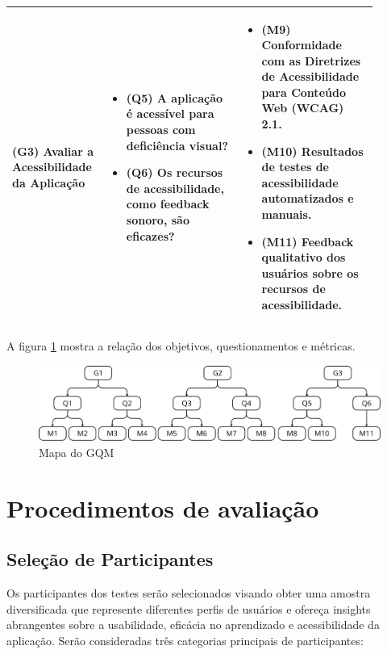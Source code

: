 \begin{table}[h]
\begin{tabular}{|p{0.2\linewidth}|p{0.35\linewidth}|p{0.35\linewidth}|}
        \textbf{(G3) Avaliar a Acessibilidade da Aplicação} & 
        \begin{itemize}
            \item (Q5) A aplicação é acessível para pessoas com deficiência visual?
            \item (Q6) Os recursos de acessibilidade, como feedback sonoro, são eficazes?
        \end{itemize} & 
        \begin{itemize}
            \item (M9) Conformidade com as Diretrizes de Acessibilidade para Conteúdo Web (WCAG) 2.1.
            \item (M10) Resultados de testes de acessibilidade automatizados e manuais.
            \item (M11) Feedback qualitativo dos usuários sobre os recursos de acessibilidade.
        \end{itemize} \\ \hline
    \end{tabular}
\end{table}

A figura \ref{fig:ch04-map-gqm} mostra a relação dos objetivos, questionamentos e métricas.

\begin{figure}[h]
    \centering
    \includegraphics[scale=0.3]{ch04/assets/map-gqm.png}
    \decoRule
    \caption[Mapa do GQM]{Mapa do GQM}
    \label{fig:ch04-map-gqm}
\end{figure}

\section{Procedimentos de avaliação}

\subsection{Seleção de Participantes}

Os participantes dos testes serão selecionados visando obter uma amostra diversificada que represente diferentes perfis de usuários e ofereça insights abrangentes sobre a usabilidade, eficácia no aprendizado e acessibilidade da aplicação. Serão consideradas três categorias principais de participantes:

